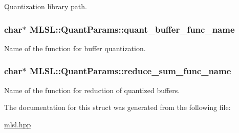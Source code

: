 Quantization library path. \hypertarget{structMLSL_1_1QuantParams_a350a858ed5502252435fa7608edda416}{
\subsubsection[{quant\-\_\-buffer\-\_\-func\-\_\-name}]{\setlength{\rightskip}{0pt plus 5cm}char$\ast$ M\-L\-S\-L\-::\-Quant\-Params\-::quant\-\_\-buffer\-\_\-func\-\_\-name}}\label{structMLSL_1_1QuantParams_a350a858ed5502252435fa7608edda416}
Name of the function for buffer quantization. \hypertarget{structMLSL_1_1QuantParams_a25df9562472e1ff98079a8943667d157}{
\subsubsection[{reduce\-\_\-sum\-\_\-func\-\_\-name}]{\setlength{\rightskip}{0pt plus 5cm}char$\ast$ M\-L\-S\-L\-::\-Quant\-Params\-::reduce\-\_\-sum\-\_\-func\-\_\-name}}\label{structMLSL_1_1QuantParams_a25df9562472e1ff98079a8943667d157}
Name of the function for reduction of quantized buffers. 

The documentation for this struct was generated from the following file\-:\begin{DoxyCompactItemize}
\item 
\hyperlink{mlsl_8hpp}{mlsl.\-hpp}\end{DoxyCompactItemize}
